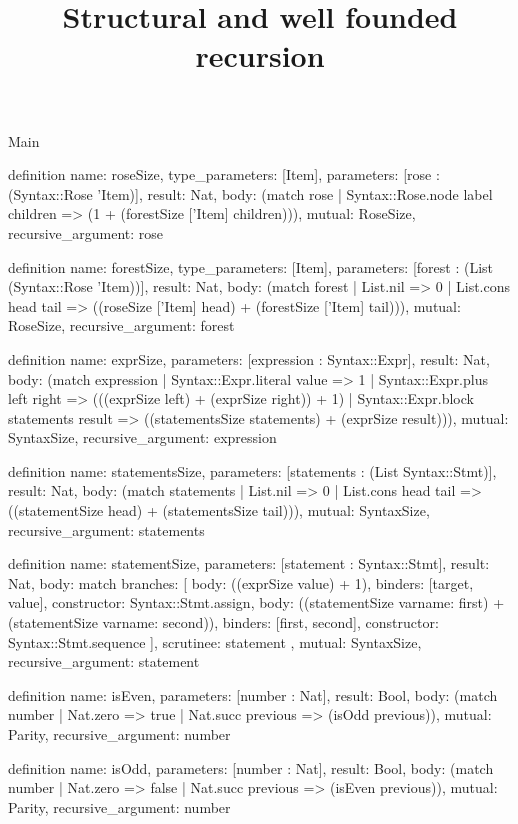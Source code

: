 \begin{lexlean}{Main}
\title{Structural and well founded recursion}
\begin{semanticmodule}
definition{
  name: roseSize,
  type_parameters: [Item],
  parameters: [rose : (Syntax::Rose 'Item)],
  result: Nat,
  body: (match rose | Syntax::Rose.node label children => (1 + (forestSize ['Item] children))),
  mutual: RoseSize,
  recursive_argument: rose
}

definition{
  name: forestSize,
  type_parameters: [Item],
  parameters: [forest : (List (Syntax::Rose 'Item))],
  result: Nat,
  body: (match forest
    | List.nil => 0
    | List.cons head tail => ((roseSize ['Item] head) + (forestSize ['Item] tail))),
  mutual: RoseSize,
  recursive_argument: forest
}

definition{
  name: exprSize,
  parameters: [expression : Syntax::Expr],
  result: Nat,
  body: (match expression
    | Syntax::Expr.literal value => 1
    | Syntax::Expr.plus left right => (((exprSize left) + (exprSize right)) + 1)
    | Syntax::Expr.block statements result => ((statementsSize statements) + (exprSize result))),
  mutual: SyntaxSize,
  recursive_argument: expression
}

definition{
  name: statementsSize,
  parameters: [statements : (List Syntax::Stmt)],
  result: Nat,
  body: (match statements
    | List.nil => 0
    | List.cons head tail => ((statementSize head) + (statementsSize tail))),
  mutual: SyntaxSize,
  recursive_argument: statements
}

definition{
  name: statementSize,
  parameters: [statement : Syntax::Stmt],
  result: Nat,
  body: match{
    branches: [
      {body: ((exprSize value) + 1), binders: [target, value], constructor: Syntax::Stmt.assign},
      {
        body: ((statementSize var{name: first}) + (statementSize var{name: second})),
        binders: [first, second],
        constructor: Syntax::Stmt.sequence
      }
    ],
    scrutinee: statement
  },
  mutual: SyntaxSize,
  recursive_argument: statement
}

definition{
  name: isEven,
  parameters: [number : Nat],
  result: Bool,
  body: (match number | Nat.zero => true | Nat.succ previous => (isOdd previous)),
  mutual: Parity,
  recursive_argument: number
}

definition{
  name: isOdd,
  parameters: [number : Nat],
  result: Bool,
  body: (match number | Nat.zero => false | Nat.succ previous => (isEven previous)),
  mutual: Parity,
  recursive_argument: number
}


\end{semanticmodule}
\end{lexlean}
